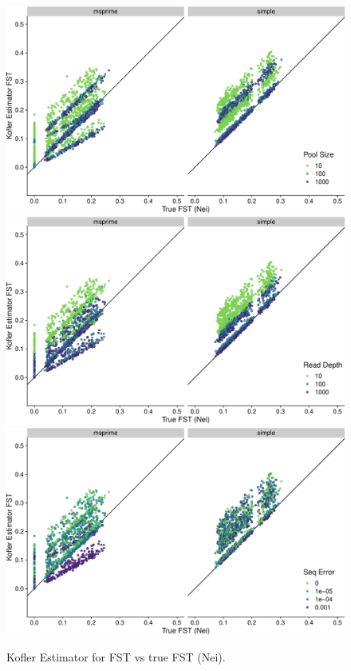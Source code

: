 \documentclass[letterpaper,fontsize=9pt,DIV=12]{scrartcl}
\begin{document}
\begin{figure}[p]
    \centering
    \includegraphics[width=.69\linewidth]{true_nei_fst-est_kofler-pool_size.pdf}
    \includegraphics[width=.69\linewidth]{true_nei_fst-est_kofler-read_depth.pdf}
    \includegraphics[width=.69\linewidth]{true_nei_fst-est_kofler-seq_error.pdf}
    \vspace*{-1em}
    \caption{
        Kofler Estimator for FST vs true FST (Nei).
    }
\label{fig:Kofler}
\end{figure}
\end{document}
